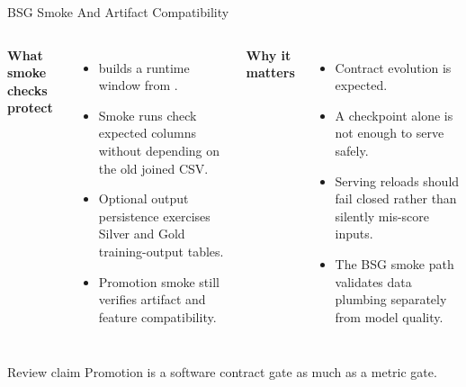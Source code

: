 \documentclass[aspectratio=169]{beamer}
\begin{document}
\begin{frame}[shrink=4]{BSG Smoke And Artifact Compatibility}
\begin{columns}[T,onlytextwidth]
\textbf{What smoke checks protect}
\begin{itemize}
  \item {} builds a runtime window from .
  \item Smoke runs check expected columns without depending on the old joined CSV.
  \item Optional output persistence exercises Silver and Gold training-output tables.
  \item Promotion smoke still verifies artifact and feature compatibility.
\end{itemize}

\textbf{Why it matters}
\begin{itemize}
  \item Contract evolution is expected.
  \item A checkpoint alone is not enough to serve safely.
  \item Serving reloads should fail closed rather than silently mis-score inputs.
  \item The BSG smoke path validates data plumbing separately from model quality.
\end{itemize}
\end{columns}
\tightsep
\begin{block}{Review claim}
\small Promotion is a software contract gate as much as a metric gate.
\end{block}
\end{frame}
\end{document}
